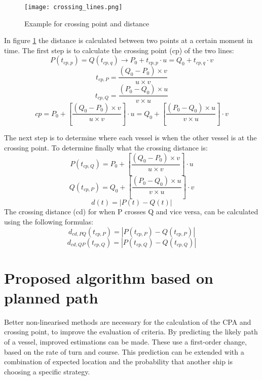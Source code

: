 \begin{figure}[h]
	\centering
	\texttt{[image: crossing\_lines.png]}
	\caption{Example for crossing point and distance}
	\label{fig:crossing-distance}
\end{figure}

In figure \ref{fig:crossing-distance} the distance is calculated between two points at a certain moment in time. The first step is to calculate the crossing point (cp) of the two lines:
\begin{equation}
P(t_{cp,p}) = Q(t_{cp,q}) \rightarrow P_0 + t_{cp,p} \cdot u = Q_0 + t_{cp,q} \cdot v
\end{equation}
\begin{equation}
t_{cp,P} = \frac{(Q_0 - P_0) \times v}{u \times v}
\end{equation}
\begin{equation}
t_{cp,Q} = \frac{(P_0 - Q_0) \times u}{v \times u}
\end{equation}
\begin{equation}
cp = P_0 + \left[ \frac{(Q_0 - P_0) \times v}{u \times v} \right] \cdot u =  Q_0 + \left[ \frac{(P_0 - Q_0) \times u}{v \times u} \right] \cdot v
\end{equation}

The next step is to determine where each vessel is when the other vessel is at the crossing point. To determine finally what the crossing distance is:
\begin{equation}
P(t_{cp,Q}) = P_0 + \left[ \frac{(Q_0 - P_0) \times v}{u \times v} \right] \cdot u
\end{equation}
\begin{equation}
Q(t_{cp,P}) = Q_0 + \left[ \frac{(P_0 - Q_0) \times u}{v \times u} \right] \cdot v
\end{equation}
\begin{equation}
d(t) = |P(t) - Q(t)|
\end{equation}
The crossing distance (cd) for when P crosses Q and vice versa, can be calculated using the following formulas:
\begin{equation}
d_{cd,PQ}(t_{cp,P}) = |P(t_{cp,P}) - Q(t_{cp,P})|
\end{equation}
\begin{equation}
d_{cd,QP}(t_{cp,Q}) = |P(t_{cp,Q}) - Q(t_{cp,Q})|
\end{equation}

\section{Proposed algorithm based on planned path}
Better non-linearised methods are necessary for the calculation of the \ac{CPA} and crossing point, to improve the evaluation of criteria. By predicting the likely path of a vessel, improved estimations can be made. These use a first-order change, based on the rate of turn and course. This prediction can be extended with a combination of expected location and the probability that another ship is choosing a specific strategy.

